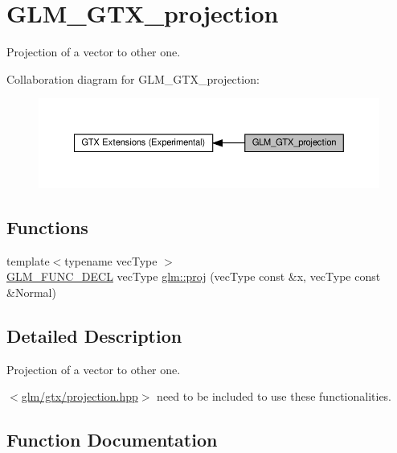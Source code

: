 \hypertarget{group__gtx__projection}{}\section{G\+L\+M\+\_\+\+G\+T\+X\+\_\+projection}
\label{group__gtx__projection}


Projection of a vector to other one.  


Collaboration diagram for G\+L\+M\+\_\+\+G\+T\+X\+\_\+projection\+:\nopagebreak
\begin{figure}[H]
\begin{center}
\leavevmode
\includegraphics[width=350pt]{group__gtx__projection}
\end{center}
\end{figure}
\subsection*{Functions}
\begin{DoxyCompactItemize}
\item 
{\footnotesize template$<$typename vec\+Type $>$ }\\\hyperlink{setup_8hpp_ab2d052de21a70539923e9bcbf6e83a51}{G\+L\+M\+\_\+\+F\+U\+N\+C\+\_\+\+D\+E\+CL} vec\+Type \hyperlink{group__gtx__projection_gadf29123bcf748fc9d6fb0998192184cf}{glm\+::proj} (vec\+Type const \&x, vec\+Type const \&Normal)
\end{DoxyCompactItemize}


\subsection{Detailed Description}
Projection of a vector to other one. 

$<$\hyperlink{projection_8hpp}{glm/gtx/projection.\+hpp}$>$ need to be included to use these functionalities. 

\subsection{Function Documentation}
\mbox{\label{group__gtx__projection_gadf29123bcf748fc9d6fb0998192184cf}} 
